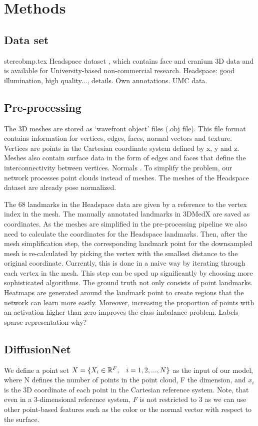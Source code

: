 \documentclass[class=article, crop=false]{standalone}
\begin{document}
\section{Methods}
\label{sec:methods}

\subsection{Data set}
{stereobmp.tex}
Headspace dataset \cite{Dai2019}, which contains face and cranium 3D data and is available for University-based non-commercial research.
Headspace: good illumination, high quality..., details. Own annotations. UMC data.

\subsection{Pre-processing}
The 3D meshes are stored as ‘wavefront object’ files (.obj file). This  file format contains information for vertices, edges, faces, normal vectors and texture.
Vertices are points in the Cartesian coordinate system defined by x, y and z. Meshes also contain surface data in the form of edges and faces that define the interconnectivity between vertices. Normals \cite{Jong}.
To simplify the problem, our network processes point clouds instead of meshes.
The meshes of the Headspace dataset are already pose normalized.

The 68 landmarks in the Headspace data are given by a reference to the vertex index in the mesh. The manually annotated landmarks in 3DMedX are saved as coordinates. As the meshes are simplified in the pre-processing pipeline we also need to calculate the coordinates for the Headspace landmarks. Then, after the mesh simplification step, the corresponding landmark point for the downsampled mesh is re-calculated by picking the vertex with the smallest distance to the original coordinate. Currently, this is done in a naive way by iterating through each vertex in the mesh. This step can be sped up significantly by choosing more sophisticated algorithms. The ground truth not only consists of point landmarks. Heatmaps are generated around the landmark point to create regions that the network can learn more easily. Moreover, increasing the proportion of points with an activation higher than zero improves the class imbalance problem. Labels sparse representation why?

\subsection{DiffusionNet}
We define a point set \begin{math}X=\{X_i \in \mathbb{R}^F,\hspace{0.3cm}i = 1,2,...,N\}\end{math} as the input of our model, where N defines the number of points in the point cloud, F the dimension, and $x_i$ is the 3D coordinate of each point in the Cartesian reference system. Note, that even in a 3-dimensional reference system, $F$ is not restricted to 3 as we can use other point-based features such as the color or the normal vector with respect to the surface.
\end{document}
